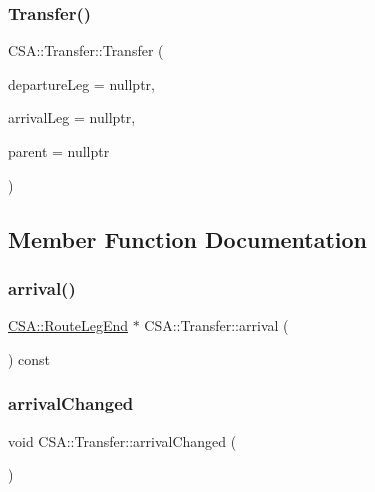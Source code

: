 \subsubsection{\texorpdfstring{Transfer()}{Transfer()}}
{\footnotesize\ttfamily C\+S\+A\+::\+Transfer\+::\+Transfer (\begin{DoxyParamCaption}\item[{\mbox{\hyperlink{classCSA_1_1RouteLeg}{C\+S\+A\+::\+Route\+Leg}} $\ast$}]{departure\+Leg = {\ttfamily nullptr},  }\item[{\mbox{\hyperlink{classCSA_1_1RouteLeg}{C\+S\+A\+::\+Route\+Leg}} $\ast$}]{arrival\+Leg = {\ttfamily nullptr},  }\item[{Q\+Object $\ast$}]{parent = {\ttfamily nullptr} }\end{DoxyParamCaption})\hspace{0.3cm}{\ttfamily [explicit]}}



\subsection{Member Function Documentation}
\mbox{\label{classCSA_1_1Transfer_a1b651e08402cf33cf12d65ad9b6f8011}} 
\subsubsection{\texorpdfstring{arrival()}{arrival()}}
{\footnotesize\ttfamily \mbox{\hyperlink{classCSA_1_1RouteLegEnd}{C\+S\+A\+::\+Route\+Leg\+End}} $\ast$ C\+S\+A\+::\+Transfer\+::arrival (\begin{DoxyParamCaption}{ }\end{DoxyParamCaption}) const}

\mbox{\label{classCSA_1_1Transfer_aea7072a6fe1de31c0c783539a879ef73}} 
\subsubsection{\texorpdfstring{arrival\+Changed}{arrivalChanged}}
{\footnotesize\ttfamily void C\+S\+A\+::\+Transfer\+::arrival\+Changed (\begin{DoxyParamCaption}{ }\end{DoxyParamCaption})\hspace{0.3cm}{\ttfamily [signal]}}

